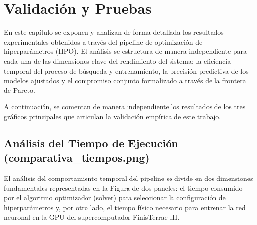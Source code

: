 \chapter{Validación y Pruebas}
\label{chap:validacion_pruebas}

En este capítulo se exponen y analizan de forma detallada los resultados experimentales obtenidos a través del pipeline de optimización de hiperparámetros (HPO). El análisis se estructura de manera independiente para cada una de las dimensiones clave del rendimiento del sistema: la eficiencia temporal del proceso de búsqueda y entrenamiento, la precisión predictiva de los modelos ajustados y el compromiso conjunto formalizado a través de la frontera de Pareto.

A continuación, se comentan de manera independiente los resultados de los tres gráficos principales que articulan la validación empírica de este trabajo.

\section{Análisis del Tiempo de Ejecución (comparativa\_tiempos.png)}
\label{sec:analisis_tiempos}

El análisis del comportamiento temporal del pipeline se divide en dos dimensiones fundamentales representadas en la Figura de dos paneles: el tiempo consumido por el algoritmo optimizador (solver) para seleccionar la configuración de hiperparámetros y, por otro lado, el tiempo físico necesario para entrenar la red neuronal en la GPU del supercomputador FinisTerrae III.

